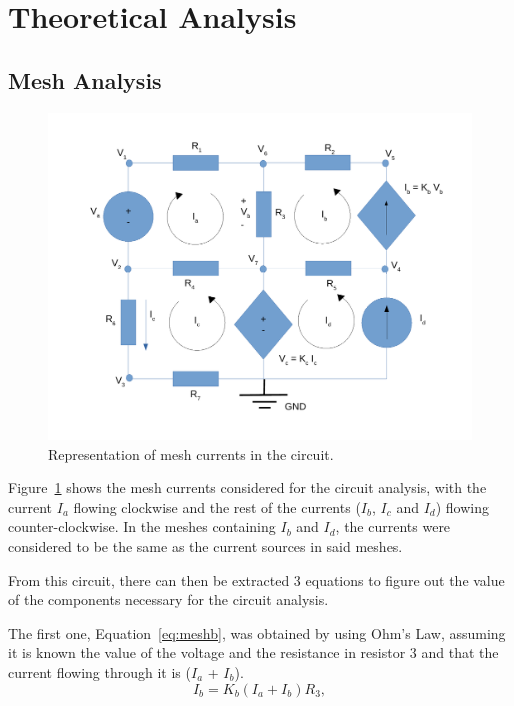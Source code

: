 \newpage
\section{Theoretical Analysis}
\label{sec:analysis}

\subsection{Mesh Analysis}

\label{sec:Mesh Analysis}
\begin{figure}[!ht] \centering
\includegraphics[width=0.8\linewidth]{circuit_mesh.pdf}
\caption{Representation of mesh currents in the circuit.}
\label{fig:meshcurrents}
\end{figure}

Figure~\ref{fig:meshcurrents} shows the mesh currents considered for the circuit analysis, with the current $I_a$ flowing clockwise and the rest of the currents ($I_b$, $I_c$ and $I_d$) flowing counter-clockwise. In the meshes containing $I_b$ and $I_d$, the currents were considered to be the same as the current sources in said meshes.

From this circuit, there can then be extracted 3 equations to figure out the value of the components necessary for the circuit analysis.

The first one, Equation~\ref{eq:meshb}, was obtained by using Ohm's Law, assuming it is known the value of the voltage and the resistance in resistor 3 and that the current flowing through it is ($I_a$ + $I_b$).
\begin{equation}
  I_{b} = K_{b}(I_{a} + I_{b})R_{3},
  \label{eq:meshb}
\end{equation}

